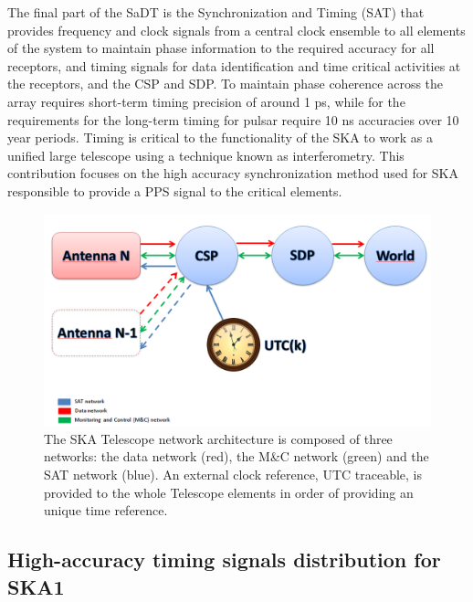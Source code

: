 The final part of the SaDT is the Synchronization and Timing (SAT) that provides frequency and clock signals from a central clock ensemble to all elements of the system to maintain phase information to the required accuracy for all receptors, and timing signals for data identification and time critical activities at the receptors, and the CSP and SDP. To maintain phase coherence across the array requires short-term timing precision of around 1 ps, while for the requirements for the long-term timing for pulsar require 10 ns accuracies over 10 year periods. Timing is critical to the functionality of the SKA to work as a unified large telescope using a technique known as interferometry. This contribution focuses on the high accuracy synchronization method used for SKA responsible to provide a PPS signal to the critical elements. 

\begin{figure}[H]
	\centering
	\includegraphics[scale=0.4]{img/ska_network_arch}
	\caption{The SKA Telescope network architecture is composed of three networks: the data network (red), the M\&C network (green) and the SAT network (blue). An external clock reference, UTC traceable, is provided to the whole Telescope elements in order of providing an unique time reference.}
	\label{fig:ska_net_arch1}
\end{figure}

\subsection{High-accuracy timing signals distribution for SKA1} \label{subsec:ska-distribution}

